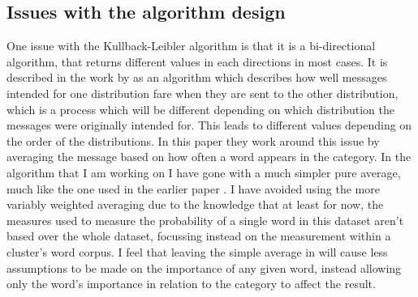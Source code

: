 \documentclass[letterpaper]{article}
\begin{document}
\subsection{Issues with the algorithm design}
One issue with the Kullback-Leibler algorithm is that it is a bi-directional algorithm, that returns different values in each directions in most cases. 
It is described in the work by \cite{baker1998distributional} as an algorithm which describes how well messages intended for one distribution fare when they are sent to the other distribution, which is a process which will be different depending on which distribution the messages were originally intended for. 
This leads to different values depending on the order of the distributions. 
In this paper they work around this issue by averaging the message based on how often a word appears in the category. 
In the algorithm that I am working on I have gone with a much simpler pure average, much like the one used in the earlier paper \cite{pereira1993distributional}. I have avoided using the more variably weighted averaging due to the knowledge that at least for now, the measures used to measure the probability of a single word in this dataset aren't based over the whole dataset, focussing instead on the measurement within a cluster's word corpus. I feel that leaving the simple average in will cause less assumptions to be made on the importance of any given word, instead allowing only the word's importance in relation to the category to affect the result.
\end{document}
